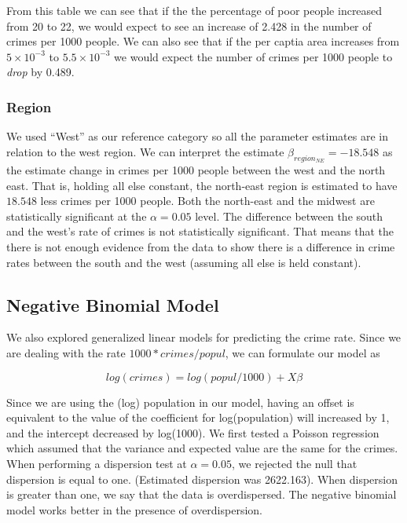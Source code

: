 \documentclass[]{article}
\begin{document}
From this table we can see that if the the percentage of poor people
increased from 20 to 22, we would expect to see an increase of 2.428 in
the number of crimes per 1000 people. We can also see that if the per
captia area increases from \(5 \times 10^{-3}\) to
\(5.5 \times 10^{-3}\) we would expect the number of crimes per 1000
people to \emph{drop} by 0.489.

\subsubsection{Region}\label{region}

We used ``West'' as our reference category so all the parameter
estimates are in relation to the west region. We can interpret the
estimate \(\beta_{region_{NE}} = -18.548\) as the estimate change in
crimes per 1000 people between the west and the north east. That is,
holding all else constant, the north-east region is estimated to have
\(18.548\) less crimes per 1000 people. Both the north-east and the
midwest are statistically significant at the \(\alpha = 0.05\) level.
The difference between the south and the west's rate of crimes is not
statistically significant. That means that the there is not enough
evidence from the data to show there is a difference in crime rates
between the south and the west (assuming all else is held constant).

\subsection{Negative Binomial Model}\label{negative-binomial-model}

We also explored generalized linear models for predicting the crime
rate. Since we are dealing with the rate \(1000 * crimes/popul\), we can
formulate our model as

\[
log(crimes) = log(popul/1000) + X\beta
\]

Since we are using the (log) population in our model, having an offset
is equivalent to the value of the coefficient for log(population) will
increased by 1, and the intercept decreased by log(1000). We first
tested a Poisson regression which assumed that the variance and expected
value are the same for the crimes. When performing a dispersion test at
\(\alpha = 0.05\), we rejected the null that dispersion is equal to one.
(Estimated dispersion was 2622.163). When dispersion is greater than
one, we say that the data is overdispersed. The negative binomial model
works better in the presence of overdispersion.
\end{document}
